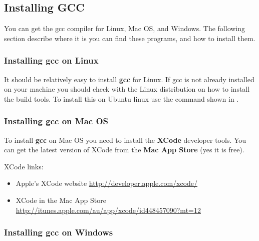 \clearpage
\subsection{Installing GCC} %
\label{sub:installing_gcc}

You can get the gcc compiler for Linux, Mac OS, and Windows. The following section describe where it is you can find these programs, and how to install them.

\subsubsection{Installing gcc on Linux} %
\label{ssub:linux}

It should be relatively easy to install \textbf{gcc} for Linux. If gcc is not already installed on your machine you should check with the Linux distribution on how to install the build tools. To install this on Ubuntu linux use the command shown in .



\subsubsection{Installing gcc on Mac OS} %
\label{ssub:installing_gcc_on_mac_os}

To install \textbf{gcc} on Mac OS you need to install the \textbf{XCode} developer tools. You can get the latest version of XCode from the \textbf{Mac App Store} (yes it is free).

XCode links:
\begin{itemize}
  \item Apple's XCode website \url{http://developer.apple.com/xcode/}
  \item XCode in the Mac App Store  \url{http://itunes.apple.com/au/app/xcode/id448457090?mt=12}
\end{itemize}



\subsubsection{Installing gcc on Windows} %
\label{ssub:installing_gcc_on_windows}

